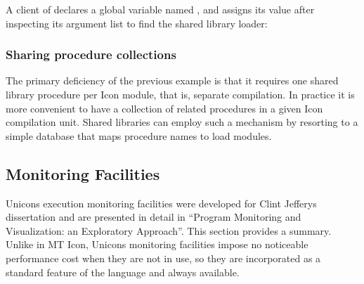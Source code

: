 
A client of  declares a global
variable named , and assigns its
value after inspecting its argument list to find the shared library
loader: 


\subsubsection{Sharing procedure collections}

The primary deficiency of the previous example is that it requires one
shared library procedure per Icon module, that is, separate
compilation. In practice it is more convenient to have a collection of
related procedures in a given Icon compilation unit. Shared libraries
can employ such a mechanism by resorting to a simple database that maps
procedure names to load modules. 

\subsection{Monitoring Facilities}

Unicon{\textquotesingle}s execution monitoring facilities were developed
for Clint Jeffery{\textquotesingle}s dissertation and are presented in
detail in {\textquotedblleft}Program Monitoring and Visualization: an
Exploratory Approach{\textquotedblright}. This section provides a
summary. Unlike in MT Icon, Unicon{\textquotesingle}s monitoring
facilities impose no noticeable performance cost when they are not in
use, so they are incorporated as a standard feature of the language and
always available.

